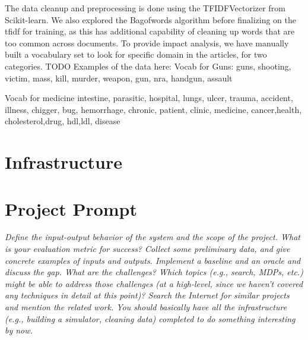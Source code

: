 \documentclass{article}
\begin{document}
The data cleanup and preprocessing is done using the TFIDFVectorizer from Scikit-learn.
We also explored the Bagofwords algorithm before finalizing on the tfidf for training, as this has additional capability of cleaning up words that are too common across documents.
To provide impact analysis, we have manually built a vocabulary set to look for specific domain in the articles, for two categories.
TODO Examples of the data here:
Vocab for Guns:
guns, shooting, victim, mass, kill, murder, weapon, gun, nra, handgun, assault

Vocab for medicine
intestine, parasitic, hospital, lungs, ulcer, trauma, accident, illness, chigger, bug, hemorrhage, chronic, patient, clinic, medicine, cancer,health, cholesterol,drug, hdl,ldl, disease
\maketitle %


\section*{Infrastructure} %

\section*{Project Prompt}

\textit{Define the input-output behavior of the system and the scope of the project. What is your evaluation metric for success? Collect some preliminary data, and give concrete examples of inputs and outputs. Implement a baseline and an oracle and discuss the gap. What are the challenges? Which topics (e.g., search, MDPs, etc.) might be able to address those challenges (at a high-level, since we haven't covered any techniques in detail at this point)? Search the Internet for similar projects and mention the related work. You should basically have all the infrastructure (e.g., building a simulator, cleaning data) completed to do something interesting by now.}
\end{document}
